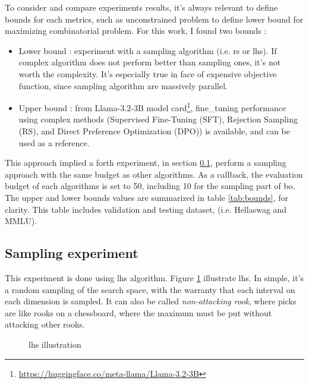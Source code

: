 To consider and compare experiments results, it's always relevant to define bounds for each metrics, such as unconstrained problem to define lower bound for maximizing combinatorial problem. For this work, I found two bounds : 
\begin{itemize}
    \item Lower bound : experiment with a sampling algorithm (i.e. \acrshort{rs} or \acrshort{lhs}). If complex algorithm does not perform better than sampling ones, it's not worth the complexity. It's especially true in face of expensive objective function, since sampling algorithm are massively parallel.
    \item Upper bound : from Llama-3.2-3B model card\footnote{\href{https://huggingface.co/meta-llama/Llama-3.2-3B}{https://huggingface.co/meta-llama/Llama-3.2-3B}}, \gls{fine_tuning} performance using complex methods (Supervised Fine-Tuning (SFT), Rejection Sampling (RS), and Direct Preference Optimization (DPO)) is available, and can be used as a reference.
\end{itemize}
This approach implied a forth experiment, in section \ref{sec:sampling}, perform a sampling approach with the same budget as other algorithms. As a callback, the evaluation budget of each algorithms is set to 50, including 10 for the sampling part of \acrshort{bo}. The upper and lower bounds values are summarized in table \ref{tab:bounds}, for clarity. This table includes validation and testing dataset, (i.e. Hellaswag and MMLU).



\subsection{Sampling experiment}
\label{sec:sampling}

This experiment is done using \acrfull{lhs} algorithm. Figure \ref{fig:lhs} illustrate \acrshort{lhs}. In simple, it's a random sampling of the search space, with the warranty that each interval on each dimension is sampled. It can also be called \textit{non-attacking rook}, where picks are like rooks on a chessboard, where the maximum must be put without attacking other rooks.

\begin{figure}[h]
    \centering
    
    \caption{\acrshort{lhs} illustration}
    \label{fig:lhs}
\end{figure}

